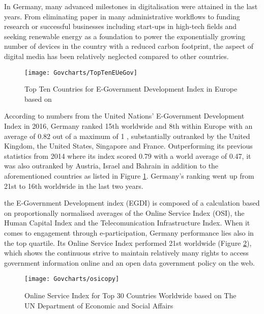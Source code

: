 In Germany, many advanced milestones in digitalisation were attained in the last years. From eliminating paper in many administrative workflows 
to funding research or successful businesses including start-ups in high-tech fields %
and seeking renewable energy as a foundation %
to power the exponentially growing number of devices in the country with a reduced carbon footprint, the aspect of digital media has been relatively neglected compared to other countries.

\begin{figure}[h!]
	\caption[E-Government Development Index in Europe]{Top Ten Countries for E-Government Development Index in Europe based on \cite{un:egovReport}}
	\label{un:egci}
	\texttt{[image: Govcharts/TopTenEUeGov]} 
\end{figure}

According to numbers from the United Nations' E-Government Development Index in 2016, Germany ranked 15th worldwide and 8th within Europe with an average of 0.82 out of a maximum of 1 %
, substantially outranked by the United Kingdom, the United States, Singapore and France. Outperforming its previous statistics from 2014 where its index scored  0.79 with a world average of 0.47, it was also outranked by Austria, Israel and Bahrain \cite{freiheit:digitalisierung} in addition to the aforementioned countries as listed in Figure \ref{un:egci}.  Germany's ranking went up from 21st to 16th worldwide in the last two years.



the E-Government Development index (EGDI) is composed of a calculation based on proportionally normalised averages of the Online Service Index (OSI), the Human Capital Index and the Telecomunication Infrastructure Index. 
When it comes to engagement through e-participation, Germany performance lies also in the top quartile. Its Online Service Index performed 21st worldwide (Figure \ref{un:osi}), which shows the continuous strive to maintain relatively many rights to access government information online and an open data government policy on the web.

\begin{figure}[h!]
	\centering
	\caption[United Nations Online Service Index (Top 30)]{Online Service Index for Top 30 Countries Worldwide based on The UN Department of Economic and Social Affairs \cite{un:egovReport}}
	\label{un:osi}
	\texttt{[image: Govcharts/osicopy]} 
\end{figure}

